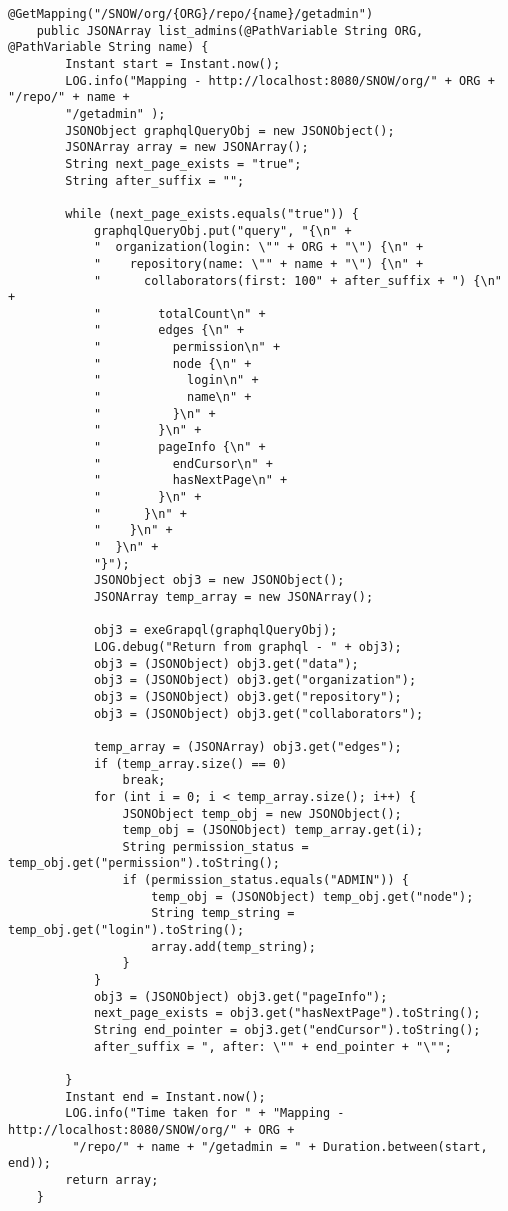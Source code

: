 \begin{lstlisting}[breaklines]
@GetMapping("/SNOW/org/{ORG}/repo/{name}/getadmin")
    public JSONArray list_admins(@PathVariable String ORG, @PathVariable String name) {
        Instant start = Instant.now();
        LOG.info("Mapping - http://localhost:8080/SNOW/org/" + ORG + "/repo/" + name + 
        "/getadmin" );
        JSONObject graphqlQueryObj = new JSONObject();
        JSONArray array = new JSONArray();
        String next_page_exists = "true";
        String after_suffix = "";

        while (next_page_exists.equals("true")) {           
            graphqlQueryObj.put("query", "{\n" +
            "  organization(login: \"" + ORG + "\") {\n" +
            "    repository(name: \"" + name + "\") {\n" +
            "      collaborators(first: 100" + after_suffix + ") {\n" +
            "        totalCount\n" +
            "        edges {\n" +
            "          permission\n" +
            "          node {\n" +
            "            login\n" +
            "            name\n" +
            "          }\n" +
            "        }\n" +
            "        pageInfo {\n" +
            "          endCursor\n" +
            "          hasNextPage\n" +
            "        }\n" +
            "      }\n" +
            "    }\n" +
            "  }\n" +
            "}");
            JSONObject obj3 = new JSONObject();
            JSONArray temp_array = new JSONArray();

            obj3 = exeGrapql(graphqlQueryObj);
            LOG.debug("Return from graphql - " + obj3);
            obj3 = (JSONObject) obj3.get("data");
            obj3 = (JSONObject) obj3.get("organization");
            obj3 = (JSONObject) obj3.get("repository");
            obj3 = (JSONObject) obj3.get("collaborators");

            temp_array = (JSONArray) obj3.get("edges");
            if (temp_array.size() == 0)
                break;
            for (int i = 0; i < temp_array.size(); i++) {
                JSONObject temp_obj = new JSONObject();
                temp_obj = (JSONObject) temp_array.get(i);
                String permission_status = temp_obj.get("permission").toString();
                if (permission_status.equals("ADMIN")) {
                    temp_obj = (JSONObject) temp_obj.get("node");
                    String temp_string = temp_obj.get("login").toString();
                    array.add(temp_string);
                }            
            }
            obj3 = (JSONObject) obj3.get("pageInfo"); 
            next_page_exists = obj3.get("hasNextPage").toString();
            String end_pointer = obj3.get("endCursor").toString();
            after_suffix = ", after: \"" + end_pointer + "\"";

        }
        Instant end = Instant.now();
        LOG.info("Time taken for " + "Mapping - http://localhost:8080/SNOW/org/" + ORG +
         "/repo/" + name + "/getadmin = " + Duration.between(start, end));
        return array;
    }
\end{lstlisting}

